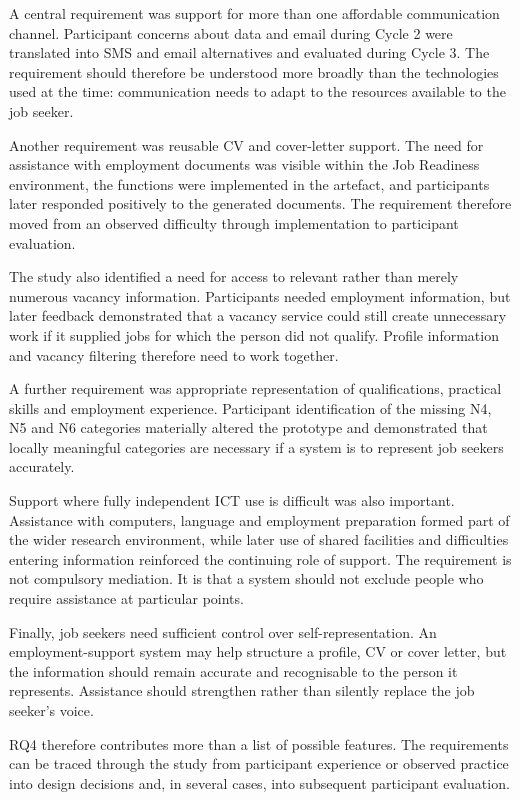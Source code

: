 A central requirement was support for more than one affordable communication channel. Participant concerns about data and email during Cycle 2 were translated into SMS and email alternatives and evaluated during Cycle 3. The requirement should therefore be understood more broadly than the technologies used at the time: communication needs to adapt to the resources available to the job seeker.

Another requirement was reusable CV and cover-letter support. The need for assistance with employment documents was visible within the Job Readiness environment, the functions were implemented in the artefact, and participants later responded positively to the generated documents. The requirement therefore moved from an observed difficulty through implementation to participant evaluation.

The study also identified a need for access to relevant rather than merely numerous vacancy information. Participants needed employment information, but later feedback demonstrated that a vacancy service could still create unnecessary work if it supplied jobs for which the person did not qualify. Profile information and vacancy filtering therefore need to work together.

A further requirement was appropriate representation of qualifications, practical skills and employment experience. Participant identification of the missing N4, N5 and N6 categories materially altered the prototype and demonstrated that locally meaningful categories are necessary if a system is to represent job seekers accurately.

Support where fully independent ICT use is difficult was also important. Assistance with computers, language and employment preparation formed part of the wider research environment, while later use of shared facilities and difficulties entering information reinforced the continuing role of support. The requirement is not compulsory mediation. It is that a system should not exclude people who require assistance at particular points.

Finally, job seekers need sufficient control over self-representation. An employment-support system may help structure a profile, CV or cover letter, but the information should remain accurate and recognisable to the person it represents. Assistance should strengthen rather than silently replace the job seeker's voice.

RQ4 therefore contributes more than a list of possible features. The requirements can be traced through the study from participant experience or observed practice into design decisions and, in several cases, into subsequent participant evaluation.



